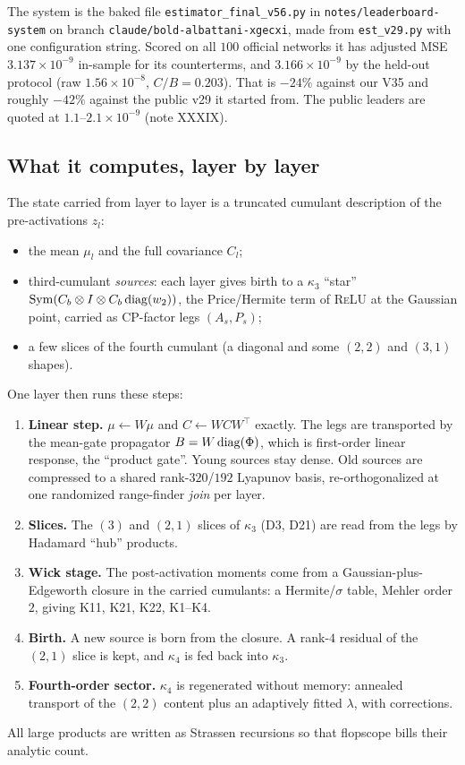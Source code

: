 \label{sec:v56}
The system is the baked file \texttt{estimator\_\allowbreak final\_\allowbreak v56.py} in \texttt{notes/\allowbreak leaderboard-\allowbreak system} on branch
\texttt{claude/\allowbreak bold-\allowbreak albattani-\allowbreak xgecxi}, made from \texttt{est\_v29.py} with one configuration string. Scored on all $100$ official networks it has adjusted MSE
$3.137\times10^{-9}$ in-sample for its counterterms, and $3.166\times10^{-9}$ by the held-out protocol (raw $1.56\times10^{-8}$,
$C/B=0.203$). That is $-24\%$ against our V35 and roughly $-42\%$ against the public v29 it started from. The public leaders are
quoted at $1.1$--$2.1\times10^{-9}$ (note XXXIX).

\subsection{What it computes, layer by layer}
The state carried from layer to layer is a truncated cumulant description of the pre-activations $z_l$:
\begin{itemize}[leftmargin=*]
\item the mean $\mu_l$ and the full covariance $C_l$;
\item third-cumulant \emph{sources}: each layer gives birth to a $\kappa_3$ ``star'' $\operatorname{Sym}(C_b\otimes I\otimes C_b\operatorname{diag}(w_2))$, the Price/Hermite
term of \textsc{ReLU} at the Gaussian point, carried as CP-factor legs $(A_s,P_s)$;
\item a few slices of the fourth cumulant (a diagonal and some $(2,2)$ and $(3,1)$ shapes).
\end{itemize}
One layer then runs these steps:
\begin{enumerate}[leftmargin=*]
\item \textbf{Linear step.} $\mu\leftarrow W\mu$ and $C\leftarrow WCW^\top$ exactly. The legs are transported by the mean-gate propagator
$B=W\operatorname{diag}(\Phi)$, which is first-order linear response, the ``product gate''. Young sources stay dense. Old sources are compressed to a
shared rank-$320$/$192$ Lyapunov basis, re-orthogonalized at one randomized range-finder \emph{join} per layer.
\item \textbf{Slices.} The $(3)$ and $(2,1)$ slices of $\kappa_3$ (D3, D21) are read from the legs by Hadamard ``hub'' products.
\item \textbf{Wick stage.} The post-activation moments come from a Gaussian-plus-Edgeworth closure in the carried cumulants: a
Hermite/$\sigma$ table, Mehler order $2$, giving K11, K21, K22, K1--K4.
\item \textbf{Birth.} A new source is born from the closure. A rank-$4$ residual of the $(2,1)$ slice is kept, and $\kappa_4$ is fed back
into $\kappa_3$.
\item \textbf{Fourth-order sector.} $\kappa_4$ is regenerated without memory: annealed transport of the $(2,2)$ content plus an
adaptively fitted $\lambda$, with corrections.
\end{enumerate}
All large products are written as Strassen recursions so that flopscope bills their analytic count.

